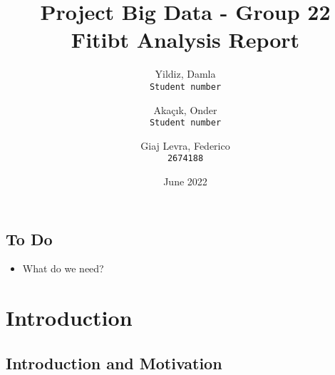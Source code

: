 \documentclass{report}
\title{Project Big Data - Group 22\\[2ex]
Fitibt Analysis Report}
\author{
  Yildiz, Damla\\
  \texttt{Student number}
  \and
  Akaçık, Onder\\
  \texttt{Student number}
  \and
  Giaj Levra, Federico\\
  \texttt{2674188}
}
\date{June 2022}
\begin{document}
\maketitle

\section*{To Do}

\begin{itemize}
    \item What do we need?
\end{itemize}

\chapter{Introduction}
\section{Introduction and Motivation}

 
 
\end{document}
